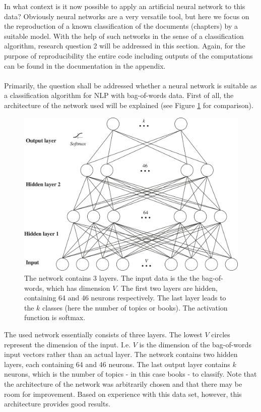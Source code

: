 \documentclass[11pt,a4paper]{article}
\begin{document}
In what context is it now possible to apply an artificial neural network to this data? Obviously neural networks are a very versatile tool, but here we focus on the reproduction of a known classification of the documents (chapters) by a suitable model. With the help of such networks in the sense of a classification algorithm, research question 2 will be addressed in this section. Again, for the purpose of reproducibility the entire code including outputs of the computations can be found in the documentation in the appendix.\\
\ \\
Primarily, the question shall be addressed whether a neural network is suitable as a classification algorithm for NLP with bag-of-words data. First of all, the architecture of the network used will be explained (see Figure \ref{fig:network_structure} for comparison).
\begin{figure}[h]
	\centering\includegraphics[width=1\textwidth]{network_structure.pdf}
	\caption{The network contains 3 layers. The input data is the the bag-of-words, which has dimension $V$. The first two layers are hidden, containing 64 and 46 neurons respectively. The last layer leads to the $k$ classes (here the number of topics or books). The activation function is softmax.}
	\label{fig:network_structure}
\end{figure}
The used network essentially consists of three layers. The lowest $V$ circles represent the dimension of the input. I.e. $V$ is the dimension of the bag-of-words input vectors rather than an actual layer. The network contains two hidden layers, each containing 64 and 46 neurons. The last output layer contains $k$ neurons, which is the number of topics - in this case books - to classify. Note that the architecture of the network was arbitrarily chosen and that there may be room for improvement. Based on experience with this data set, however, this architecture provides good results.\\
\end{document}
